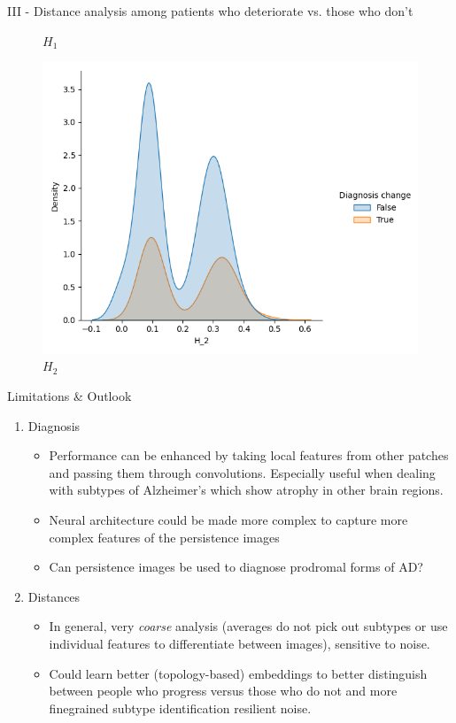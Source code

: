 \documentclass[aspectratio=169, 10pt, dvipsnames]{beamer}
\begin{document}
\begin{frame}[fragile]{III - Distance analysis among patients who deteriorate vs. those who don't}
\begin{figure}
    \caption{$H_1$}
  \end{figure}%
  \endminipage
  \hfill
  \begin{figure}
    \centering
     \includegraphics[width=\textwidth]{figures/temporal_evolution/wasserstein_H_2_dist_diag_change.png}
     \caption{$H_2$}
  \end{figure}
  \endminipage
\end{frame}

\begin{frame}[fragile]{Limitations \& Outlook}
  \begin{enumerate}
  \item Diagnosis
    \begin{itemize}
     \item Performance can be enhanced by taking local features from other patches and passing them through convolutions. Especially useful when dealing with subtypes of Alzheimer's which show atrophy in other brain regions.
     \item Neural architecture could be made more complex to capture more complex features of the persistence images
     \item Can persistence images be used to diagnose prodromal forms of AD?
  \end{itemize}
   \item Distances
    \begin{itemize}
     \item In general, very \emph{coarse} analysis (averages do not pick out subtypes or use individual features to differentiate between images), sensitive to noise.
     \item Could learn better (topology-based) embeddings to better distinguish between people who progress versus those who do not and more finegrained subtype identification resilient noise.
    \end{itemize}
  \end{enumerate}
\end{frame}
\end{document}
